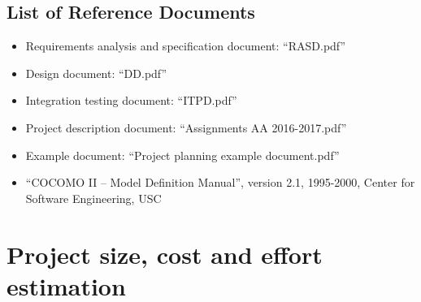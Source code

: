\documentclass[english]{article}
\begin{document}

\subsection{List of Reference Documents}

\begin{itemize}
	\item{Requirements analysis and specification document: “RASD.pdf”}
	\item{Design document: “DD.pdf”}
	\item{Integration testing document: “ITPD.pdf”}
	\item{Project description document: “Assignments AA 2016-2017.pdf”}
	\item{Example document: “Project planning example document.pdf”}
	\item{“COCOMO II -- Model Definition Manual”, version 2.1, 1995-2000, Center for Software Engineering, USC} %
\end{itemize}

\section{Project size, cost and effort estimation}

\end{document}
